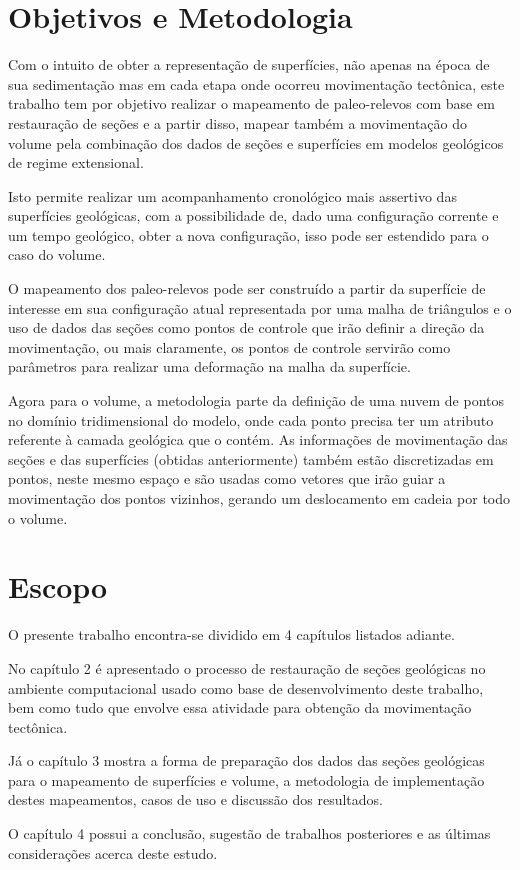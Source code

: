 \section{Objetivos e Metodologia}

Com o intuito de obter a representação de superfícies, não apenas na época de sua sedimentação mas em cada etapa onde ocorreu movimentação tectônica, este trabalho tem por objetivo realizar o mapeamento de paleo-relevos com base em restauração de seções e a partir disso, mapear também a movimentação do volume pela combinação dos dados de seções e superfícies em modelos geológicos de regime extensional.

Isto permite realizar um acompanhamento cronológico mais assertivo das superfícies geológicas, com a possibilidade de, dado uma configuração corrente e um tempo geológico, obter a nova configuração, isso pode ser estendido para o caso do volume.

O mapeamento dos paleo-relevos pode ser construído a partir da superfície de interesse em sua configuração atual representada por uma malha de triângulos e o uso de dados das seções como pontos de controle que irão definir a direção da movimentação, ou mais claramente, os pontos de controle servirão como parâmetros para realizar uma deformação na malha da superfície.

Agora para o volume, a metodologia parte da definição de uma nuvem de pontos no domínio tridimensional do modelo, onde cada ponto precisa ter um atributo referente à camada geológica que o contém. As informações de movimentação das seções e das superfícies (obtidas anteriormente) também estão discretizadas em pontos, neste mesmo espaço e são usadas como vetores que irão guiar a movimentação dos pontos vizinhos, gerando um deslocamento em cadeia por todo o volume. 

\section{Escopo}

O presente trabalho encontra-se dividido em 4 capítulos listados adiante.

No capítulo 2 é apresentado o processo de restauração de seções geológicas no ambiente computacional usado como base de desenvolvimento deste trabalho, bem como tudo que envolve essa atividade para obtenção da movimentação tectônica.

Já o capítulo 3 mostra a forma de preparação dos dados das seções geológicas para o mapeamento de superfícies e volume, a metodologia de implementação destes mapeamentos, casos de uso e discussão dos resultados.

O capítulo 4 possui a conclusão, sugestão de trabalhos posteriores e as últimas considerações acerca deste estudo.




